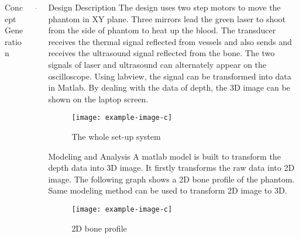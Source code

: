 \documentclass[final]{beamer}
\begin{document}
\begin{frame}
\begin{columns}[t]
\begin{column}{\colwidth}
\begin{tcolorbox}[width=\colwidth,height=\contentheight,top=.2in]
\begin{block}{Concept Generation}
\vspace{-.2in}

\begin{figure}[H]
\texttt{[image: example-image-b]}
\caption{Concept Diagram}
\end{figure}

\end{block}

\end{tcolorbox}
\end{column}

\begin{column}{\marginwidth-\parsep}\end{column} %

\begin{column}{\colwidth} %
\begin{tcolorbox}[width=\colwidth,height=\contentheight,top=.2in]
\begin{block}{Design Description}
The design uses two step motors to move the phantom in XY plane. Three mirrors lead the green laser to shoot from the side of phantom to heat up the blood. The transducer receives the thermal signal reflected from vessels and also sends and receives
the ultrasound signal reflected from the bone. The two signals of laser and ultrasound can alternately appear on the oscilloscope. Using labview, the signal can be transformed into data in Matlab. By dealing with the data of depth, the 3D image can be shown on the laptop screen.

\vspace{.2in}

\begin{figure}[H]
\texttt{[image: example-image-c]}
\caption{The whole set-up system}
\end{figure}

\end{block}

\vspace{-.5in}

\begin{block}{Modeling and Analysis}
A matlab model is built to transform the depth data into 3D image. It firstly transforms the raw data into 2D image. The following graph shows a 2D bone profile of the phantom. Same modeling method can be used to transform 2D image to 3D.

\vspace{.2in}

\begin{figure}[H]
\texttt{[image: example-image-c]}
\caption{2D bone profile}
\end{figure}


\end{block}
\end{tcolorbox}
\end{column}
\end{columns}
\end{frame}
\end{document}
